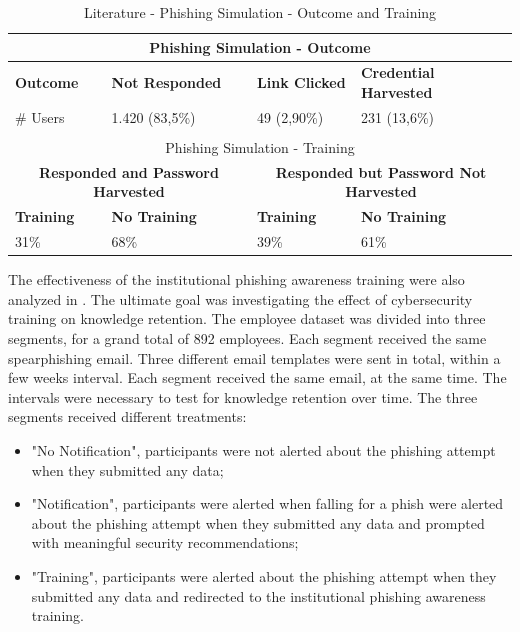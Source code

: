 \documentclass[a4paper]{article}
\begin{document}
\smallskip

\begingroup
\renewcommand{\arraystretch}{1.25}
\begin{table}[ht]
\begin{center}
    \begin{tabular}{ | m{3cm} | m{3cm} | m{3cm} | m{3cm} | }
    \hline
    
    \multicolumn{4}{|c|}{Phishing Simulation - Outcome} \\ \hline
    
    \textbf{Outcome} & \textbf{Not Responded} & \textbf{Link Clicked} & \textbf{Credential Harvested} \\ \hline
    \# Users & 1.420 (83,5\%) & 49 (2,90\%) & 231 (13,6\%) \\ \hline
    
    \multicolumn{4}{l}{} \\ \hline
    
    \multicolumn{4}{|c|}{Phishing Simulation - Training} \\ \hline
    
    \multicolumn{2}{|c|}{\textbf{Responded and Password Harvested}} & \multicolumn{2}{|c|}{\textbf{Responded but Password Not Harvested}} \\ \hline
    \textbf{Training} & \textbf{No Training} & \textbf{Training} & \textbf{No Training} \\ \hline
    31\% & 68\% & 39\% & 61\% \\ \hline
    \end{tabular}
\end{center}
\caption{Literature - Phishing Simulation - Outcome and Training \cite{lit-casestudy-organisational-learning}}
\label{tb-lit7}
\end{table}
\endgroup

\noindent
The effectiveness of the institutional phishing awareness training were also analyzed in \cite{lit-casestudy-empirical-benefits}. The ultimate goal was investigating the effect of cybersecurity training on knowledge retention. The employee dataset was divided into three segments, for a grand total of 892 employees. Each segment received the same spearphishing email. Three different email templates were sent in total, within a few weeks interval. Each segment received the same email, at the same time. The intervals were necessary to test for knowledge retention over time. The three segments received different treatments:

\begin{itemize}
    \item "No Notification", participants were not alerted about the phishing attempt when they submitted any data;
    \item "Notification", participants were alerted when falling for a phish were alerted about the phishing attempt when they submitted any data and prompted with meaningful security recommendations;
    \item "Training", participants were alerted about the phishing attempt when they submitted any data and redirected to the institutional phishing awareness training.
\end{itemize}
\end{document}
